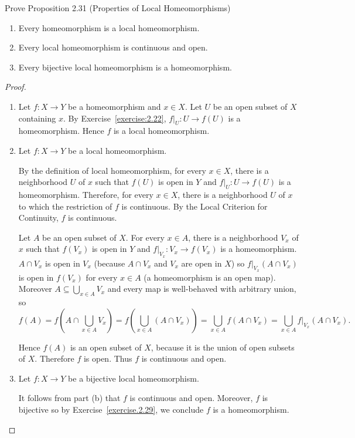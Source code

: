 \begin{exercise}{2.32}
	Prove Proposition 2.31 (Properties of Local Homeomorphisms)
	\begin{enumerate}[label={(\alph*)}]
		\item Every homeomorphism is a local homeomorphism.
		\item Every local homeomorphism is continuous and open.
		\item Every bijective local homeomorphism is a homeomorphism.
	\end{enumerate}
\end{exercise}

\begin{proof}
	\begin{enumerate}[label={(\alph*)}]
		\item Let $f: X\to Y$ be a homeomorphism and $x\in X$. Let $U$ be an open subset of $X$ containing $x$. By Exercise~\ref{exercise:2.22}, $f\vert_{U}: U\to f(U)$ is a homeomorphism. Hence $f$ is a local homeomorphism.
		\item Let $f: X\to Y$ be a local homeomorphism.

		      By the definition of local homeomorphism, for every $x\in X$, there is a neighborhood $U$ of $x$ such that $f(U)$ is open in $Y$ and $f\vert_{U}: U\to f(U)$ is a homeomorphism. Therefore, for every $x\in X$, there is a neighborhood $U$ of $x$ to which the restriction of $f$ is continuous. By the Local Criterion for Continuity, $f$ is continuous.

		      Let $A$ be an open subset of $X$. For every $x\in A$, there is a neighborhood $V_{x}$ of $x$ such that $f(V_{x})$ is open in $Y$ and $f\vert_{V_{x}}: V_{x}\to f(V_{x})$ is a homeomorphism. $A\cap V_{x}$ is open in $V_{x}$ (because $A\cap V_{x}$ and $V_{x}$ are open in $X$) so $f\vert_{V_{x}}(A\cap V_{x})$ is open in $f(V_{x})$ for every $x\in A$ (a homeomorphism is an open map). Moreover $A\subseteq \bigcup_{x\in A}V_{x}$ and every map is well-behaved with arbitrary union, so
		      \[
			      f(A) = f\left(A\cap \bigcup_{x\in A}V_{x}\right) = f\left(\bigcup_{x\in A}(A\cap V_{x})\right) = \bigcup_{x\in A} f(A\cap V_{x}) = \bigcup_{x\in A} f\vert_{V_{x}}(A\cap V_{x}).
		      \]

		      Hence $f(A)$ is an open subset of $X$, because it is the union of open subsets of $X$. Therefore $f$ is open. Thus $f$ is continuous and open.
		\item Let $f: X\to Y$ be a bijective local homeomorphism.

		      It follows from part (b) that $f$ is continuous and open. Moreover, $f$ is bijective so by Exercise~\ref{exercise.2.29}, we conclude $f$ is a homeomorphism.
	\end{enumerate}
\end{proof}

